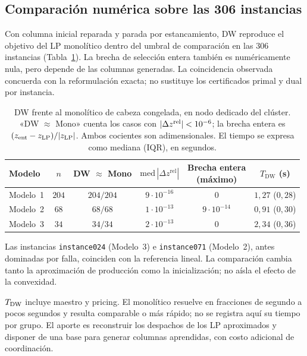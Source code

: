 \subsection{Comparación numérica sobre las 306 instancias}
\label{subsec:dw_lp_resultados}

Con columna inicial reparada y parada por estancamiento, DW reproduce el objetivo del LP monolítico dentro del umbral de comparación en las $306$ instancias (Tabla~\ref{tab:dw_lp_validacion}). La brecha de selección entera también es numéricamente nula, pero depende de las columnas generadas. La coincidencia observada concuerda con la reformulación exacta; no sustituye los certificados primal y dual por instancia.

\begin{table}[H]
\centering
\caption[Validación de Dantzig--Wolfe sobre las 306 instancias lineales]{DW frente al monolítico de cabeza congelada, en nodo dedicado del clúster. «DW $\approx$ Mono» cuenta los casos con $|\Delta z^{\rm rel}|<10^{-6}$; la brecha entera es $(z_{\rm ent}-z_{\rm LP})/|z_{\rm LP}|$. Ambos cocientes son adimensionales. El tiempo se expresa como mediana (IQR), en segundos.}
\label{tab:dw_lp_validacion}
\small
\renewcommand{\arraystretch}{1.2}
\begin{tabularx}{\textwidth}{@{}>{\raggedright\arraybackslash}Xccccc@{}}
\toprule
\textbf{Modelo} & $n$ & DW $\approx$ Mono & $\mathrm{med}\,|\Delta z^{\mathrm{rel}}|$ & \shortstack{Brecha entera\\(máximo)} & $T_{\mathrm{DW}}$ (s) \\
\midrule
Modelo~1   & $204$ & $204/204$ & $9\cdot10^{-16}$ & $0$              & $1{,}27$ ($0{,}28$) \\
Modelo~2      & $68$  & $68/68$   & $1\cdot10^{-13}$ & $9\cdot10^{-14}$ & $0{,}91$ ($0{,}30$) \\
Modelo~3 & $34$  & $34/34$   & $2\cdot10^{-13}$ & $0$              & $2{,}34$ ($0{,}36$) \\
\bottomrule
\end{tabularx}
\end{table}

Las instancias \texttt{instance024} (Modelo~3) e \texttt{instance071} (Modelo~2), antes dominadas por falla, coinciden con la referencia lineal. La comparación cambia tanto la aproximación de producción como la inicialización; no aísla el efecto de la convexidad.

$T_{\rm DW}$ incluye maestro y pricing. El monolítico resuelve en fracciones de segundo a pocos segundos y resulta comparable o más rápido; no se registra aquí su tiempo por grupo. El aporte es reconstruir los despachos de los LP aproximados y disponer de una base para generar columnas aprendidas, con costo adicional de coordinación.



